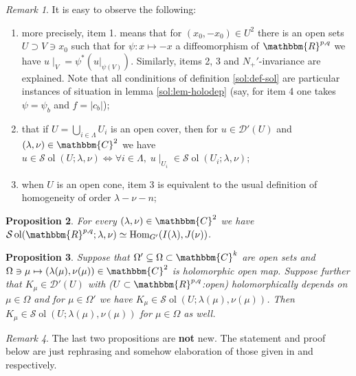 \documentclass[12pt]{article}
\newcommand{\tmop}[1]{\ensuremath{\operatorname{#1}}}
\newcommand{\tmtextbf}[1]{{\bfseries{#1}}}
\newtheorem{proposition}{Proposition}[section]
\theoremstyle{remark}
\newtheorem{remark}[proposition]{Remark}
\begin{document}
\begin{remark}
  It is easy to observe the following:
  \begin{enumerate}
    \item more precisely, item 1. means that for $(x_0, - x_0) \in U^2$ there
    is an open sets $U \supset V \ni x_0$ such that for $\psi : x \mapsto - x$
    a diffeomorphism of $\mathbbm{R}^{p, q}$ we have $u \mid_V =
    \psi^{\ast} (u |_{\psi (V)})$. Similarly, items 2, 3 and $N_+'$-invariance
    are explained. Note that all condinitions of definition \ref{sol:def-sol}
    are particular instances of situation in lemma \ref{sol:lem-holodep} (say,
    for item 4 one takes $\psi = \psi_b$ and $f = | c_b |$);
    
    \item that if $U = \bigcup_{i \in \Lambda} U_i$ is an open cover, then for
    $u \in \mathcal{D}' (U)$ and $(\lambda, \nu) \in \mathbbm{C}^2$ we have $u
    \in \mathcal{S} \tmop{ol} (U ; \lambda, \nu) \Leftrightarrow \forall i \in
    \Lambda, \; u \mid_{U_i} \in \mathcal{S} \tmop{ol} (U_i ; \lambda,
    \nu)$;
    
    \item when $U$ is an open cone, item 3 is equivalent to the usual
    definition of homogeneity of order $\lambda - \nu - n$;
  \end{enumerate}
\end{remark}

\begin{proposition}
  \label{sol:prop-sol}For every $(\lambda, \nu) \in \mathbbm{C}^2$ we have
  $\mathcal{S} \tmop{ol} (\mathbbm{R}^{p, q} ; \lambda, \nu) \simeq
  \tmop{Hom}_{G'} (I (\lambda), J (\nu))$.
\end{proposition}

\begin{proposition}
  \label{sol:prop-holocont}Suppose that $\Omega' \subseteq \Omega \subset
  \mathbbm{C}^k$ are open sets and $\Omega \ni \mu \mapsto (\lambda (\mu), \nu
  (\mu)) \in \mathbbm{C}^2$ is holomorphic open map. Suppose further that
  $K_{\mu} \in \mathcal{D}' (U)$ with ($U \subset \mathbbm{R}^{p, q}$:open)
  holomorphically depends on $\mu \in \Omega$ and for $\mu \in \Omega'$ we
  have $K_{\mu} \in \mathcal{S} \tmop{ol} (U ; \lambda (\mu), \nu (\mu))$.
  Then $K_{\mu} \in \mathcal{S} \tmop{ol} (U ; \lambda (\mu), \nu (\mu))$ for
  $\mu \in \Omega$ as well.
\end{proposition}

\begin{remark}
  The last two propositions are \tmtextbf{not} new. The statement and proof
  below are just rephrasing and somehow elaboration of those given in
  {\cite[thm 3.16]{kobayashi2015symmetry}} and {\cite[prop.
  3.18]{kobayashi2015symmetry}} respectively.
\end{remark}
\end{document}
